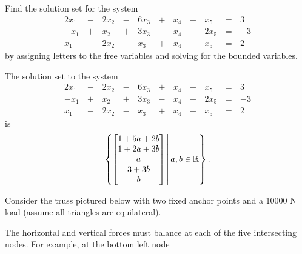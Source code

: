 \begin{applicationActivities}{2}{4}
\begin{activity}{10}
Find the solution set for the system
\begin{alignat*}{6}
2x_1&\,-\,&2x_2&\,-\,&6x_3&\,+\,&x_4&\,-\,&x_5&\,=\,&3 \\
-x_1&\,+\,&x_2&\,+\,&3x_3&\,-\,&x_4&\,+\,&2x_5 &\,=\,& -3 \\
x_1&\,-\,&2x_2&\,-\,&x_3&\,+\,&x_4&\,+\,&x_5 &\,=\,& 2
\end{alignat*}
by assigning letters to the free variables and solving for the bounded variables. 
\end{activity}

\begin{observation}
The solution set to the system
\begin{alignat*}{6}
2x_1&\,-\,&2x_2&\,-\,&6x_3&\,+\,&x_4&\,-\,&x_5&\,=\,&3 \\
-x_1&\,+\,&x_2&\,+\,&3x_3&\,-\,&x_4&\,+\,&2x_5 &\,=\,& -3 \\
x_1&\,-\,&2x_2&\,-\,&x_3&\,+\,&x_4&\,+\,&x_5 &\,=\,& 2
\end{alignat*}
is \[\left\{ \begin{bmatrix} 1+5a+2b \\ 1+2a+3b \\ a \\3+3b \\ b \end{bmatrix}\,\middle|\, a,b\in \mathbb{R}\right\}.\]
\end{observation}

\begin{observation}
Consider the truss pictured below with two fixed anchor points and a 10000 N load (assume all triangles are equilateral).
\drawtruss

The horizontal and vertical forces must balance at each of the five intersecting nodes.  For example, at the bottom left node
\begin{multicols}{4}



\end{multicols}
\end{observation}
\end{applicationActivities}
